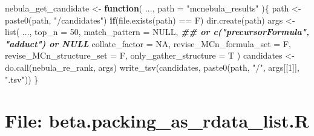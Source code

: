 \documentclass[
]{article}
\newenvironment{Shaded}{\begin{snugshade}}{\end{snugshade}}
\newcommand{\AttributeTok}[1]{\textcolor[rgb]{0.77,0.63,0.00}{#1}}
\newcommand{\ConstantTok}[1]{\textcolor[rgb]{0.00,0.00,0.00}{#1}}
\newcommand{\ControlFlowTok}[1]{\textcolor[rgb]{0.13,0.29,0.53}{\textbf{#1}}}
\newcommand{\DecValTok}[1]{\textcolor[rgb]{0.00,0.00,0.81}{#1}}
\newcommand{\DocumentationTok}[1]{\textcolor[rgb]{0.56,0.35,0.01}{\textbf{\textit{#1}}}}
\newcommand{\FunctionTok}[1]{\textcolor[rgb]{0.00,0.00,0.00}{#1}}
\newcommand{\NormalTok}[1]{#1}
\newcommand{\OtherTok}[1]{\textcolor[rgb]{0.56,0.35,0.01}{#1}}
\newcommand{\SpecialCharTok}[1]{\textcolor[rgb]{0.00,0.00,0.00}{#1}}
\newcommand{\StringTok}[1]{\textcolor[rgb]{0.31,0.60,0.02}{#1}}
\begin{document}
\begin{Shaded}
\begin{Highlighting}[]
\NormalTok{nebula\_get\_candidate }\OtherTok{\textless{}{-}} 
  \ControlFlowTok{function}\NormalTok{(}
\NormalTok{           ...,}
           \AttributeTok{path =} \StringTok{"mcnebula\_results"}
\NormalTok{           )\{}
\NormalTok{    path }\OtherTok{\textless{}{-}} \FunctionTok{paste0}\NormalTok{(path, }\StringTok{"/candidates"}\NormalTok{)}
    \ControlFlowTok{if}\NormalTok{(}\FunctionTok{file.exists}\NormalTok{(path) }\SpecialCharTok{==}\NormalTok{ F)}
      \FunctionTok{dir.create}\NormalTok{(path)}
\NormalTok{    args }\OtherTok{\textless{}{-}} \FunctionTok{list}\NormalTok{(}
\NormalTok{                 ...,}
                 \AttributeTok{top\_n =} \DecValTok{50}\NormalTok{,}
                 \AttributeTok{match\_pattern =} \ConstantTok{NULL}\NormalTok{, }\DocumentationTok{\#\# or c("precursorFormula", "adduct") or NULL}
                 \AttributeTok{collate\_factor =} \ConstantTok{NA}\NormalTok{,}
                 \AttributeTok{revise\_MCn\_formula\_set =}\NormalTok{ F,}
                 \AttributeTok{revise\_MCn\_structure\_set =}\NormalTok{ F,}
                 \AttributeTok{only\_gather\_structure =}\NormalTok{ T}
\NormalTok{    )}
\NormalTok{    candidates }\OtherTok{\textless{}{-}} \FunctionTok{do.call}\NormalTok{(nebula\_re\_rank, args)}
    \FunctionTok{write\_tsv}\NormalTok{(candidates, }\FunctionTok{paste0}\NormalTok{(path, }\StringTok{"/"}\NormalTok{, args[[}\DecValTok{1}\NormalTok{]], }\StringTok{".tsv"}\NormalTok{))}
\NormalTok{  \}}
\end{Highlighting}
\end{Shaded}

\hypertarget{file-beta.packing_as_rdata_list.r}{%
\section{File: beta.packing\_as\_rdata\_list.R}\label{file-beta.packing_as_rdata_list.r}}
\end{document}
